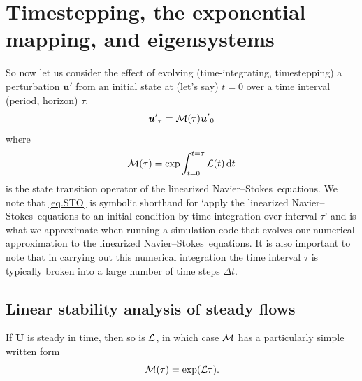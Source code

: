 \documentclass[11pt,a4paper]{report}
\newcommand\cd{\mathrm{d}}
\newcommand\NavSto{Navier--Stokes}
\newcommand\LNS{linearized \NavSto}
\newcommand\LNSE{\LNS\ equations}
\newcommand\Ubase{{\bm{U}}}
\newcommand\upert{{\bm{u}'}}
\newcommand\Lop{{\cal L}}
\newcommand\Mop{{\cal M}}
\begin{document}
\section{Timestepping, the exponential mapping, and eigensystems}
\label{sec.timestep}

So now let us consider the effect of evolving (time-integrating,
timestepping) a perturbation $\upert$ from an initial state at (let's
say) $t=0$ over a time interval (period, horizon) $\tau$.
\begin{equation}
\upert_\tau=\Mop(\tau)\upert_0
\label{eq.STO}
\end{equation}
where 
\begin{equation}
\Mop(\tau) = \exp \int_{t=0}^{t=\tau}\Lop(t)\,\cd t
\end{equation}
is the state transition operator of the \LNSE. We note
that \eqref{eq.STO} is symbolic shorthand for `apply the
\LNS\ equations to an initial condition by time-integration over
interval $\tau$' and is what we approximate when running a simulation
code that evolves our numerical approximation to the \LNSE.  It is
also important to note that in carrying out this numerical integration
the time interval $\tau$ is typically broken into a large number of
time steps $\Delta t$.
%

\subsection{Linear stability analysis of steady flows}
\label{sec.steady}

If $\Ubase$ is steady in time, then so is $\Lop$, in which case $\Mop$
has a particularly simple written form
\begin{equation}
\Mop(\tau)=\exp(\Lop\tau).
\label{eq.map}
\end{equation}
\end{document}

